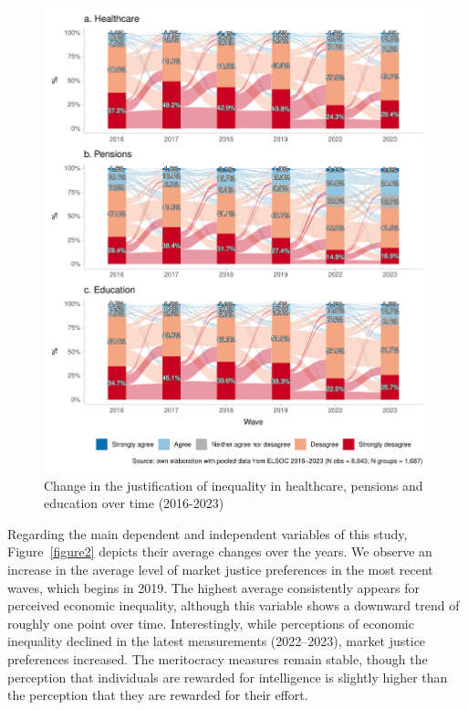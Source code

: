 \documentclass[
  12pt,
]{article}
\begin{document}
\begin{figure}[H]

{\centering \includegraphics[width=1\textwidth,height=\textheight]{figure1.pdf}

}

\caption{\label{figure1}Change in the justification of inequality
in healthcare, pensions and education over time (2016-2023)}

\end{figure}

Regarding the main dependent and independent variables of this study,
Figure~\ref{figure2} depicts their average changes over the
years. We observe an increase in the average level of market justice
preferences in the most recent waves, which begins in 2019. The highest
average consistently appears for perceived economic inequality, although
this variable shows a downward trend of roughly one point over time.
Interestingly, while perceptions of economic inequality declined in the
latest measurements (2022--2023), market justice preferences increased.
The meritocracy measures remain stable, though the perception that
individuals are rewarded for intelligence is slightly higher than the
perception that they are rewarded for their effort.
\end{document}
